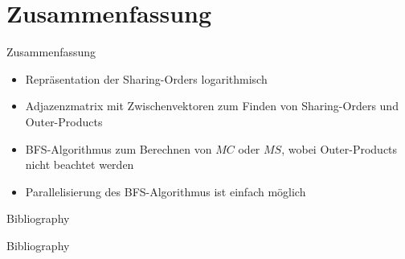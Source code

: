\documentclass{beamer}
\begin{document}
\section{Zusammenfassung}

\begin{frame}{Zusammenfassung}
	\begin{itemize}
		\item Repräsentation der Sharing-Orders logarithmisch
		\item Adjazenzmatrix mit Zwischenvektoren zum Finden von Sharing-Orders und Outer-Products
		\item BFS-Algorithmus zum Berechnen von $MC$ oder $MS$, wobei Outer-Products nicht beachtet werden
		\item Parallelisierung des BFS-Algorithmus ist einfach möglich
	\end{itemize}
\end{frame}

\begin{frame}[allowframebreaks]{Bibliography}
	
	
\end{frame}

\begin{frame}[allowframebreaks]{Bibliography}
	
	
	\nocite{*}
\end{frame}
\end{document}
